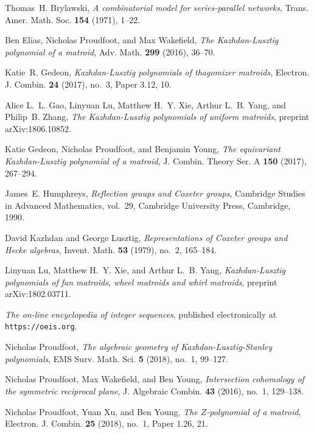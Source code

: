 \documentclass[12pt,reqno]{amsart}
\theoremstyle{definition}
\theoremstyle{remark}
\newcommand{\arxiv}[1]{\href{http://arxiv.org/abs/#1}{\textsf{arXiv:#1}}}
\renewcommand{\(}{\left(}
\renewcommand{\)}{\right)}
\newcommand{\<}{\left<}
\renewcommand{\>}{\right>}
\begin{document}
\newcommand{\etalchar}[1]{$^{#1}$}
\providecommand{\bysame}{\leavevmode\hbox to3em{\hrulefill}\thinspace}
\providecommand{\MR}{\relax\ifhmode\unskip\space\fi MR }
\providecommand{\MRhref}[2]{%
  \href{http://www.ams.org/mathscinet-getitem?mr=#1}{#2}
}
\providecommand{\href}[2]{#2}
\begin{thebibliography}{PWY16}

Thomas~H. Brylawski, \emph{A combinatorial model for series-parallel networks},
  Trans. Amer. Math. Soc. \textbf{154} (1971), 1--22.

Ben Elias, Nicholas Proudfoot, and Max Wakefield, \emph{The {K}azhdan-{L}usztig
  polynomial of a matroid}, Adv. Math. \textbf{299} (2016), 36--70.

Katie~R. Gedeon, \emph{Kazhdan-{L}usztig polynomials of thagomizer matroids},
  Electron. J. Combin. \textbf{24} (2017), no.~3, Paper 3.12, 10.

\bibitem[GLX{\etalchar{+}}]{GLXYZ}
Alice L.~L. Gao, Linyuan Lu, Matthew H.~Y. Xie, Arthur L.~B. Yang, and
  Philip~B. Zhang, \emph{The {K}azhdan-{L}usztig polynomials of uniform
  matroids}, preprint \arxiv{1806.10852}.

Katie Gedeon, Nicholas Proudfoot, and Benjamin Young, \emph{The equivariant
  {K}azhdan-{L}usztig polynomial of a matroid}, J. Combin. Theory Ser. A
  \textbf{150} (2017), 267--294.

James~E. Humphreys, \emph{Reflection groups and {C}oxeter groups}, Cambridge
  Studies in Advanced Mathematics, vol.~29, Cambridge University Press,
  Cambridge, 1990.

David Kazhdan and George Lusztig, \emph{Representations of {C}oxeter groups and
  {H}ecke algebras}, Invent. Math. \textbf{53} (1979), no.~2, 165--184.

Linyuan Lu, Matthew H.~Y. Xie, and Arthur L.~B. Yang, \emph{{K}azhdan-{L}usztig
  polynomials of fan matroids, wheel matroids and whirl matroids}, preprint
  \arxiv{1802.03711}.

\emph{The on-line encyclopedia of integer sequences}, published electronically
  at {\tt https://oeis.org}.

Nicholas Proudfoot, \emph{The algebraic geometry of
  {K}azhdan-{L}usztig-{S}tanley polynomials}, EMS Surv. Math. Sci. \textbf{5}
  (2018), no.~1, 99--127.

Nicholas Proudfoot, Max Wakefield, and Ben Young, \emph{Intersection cohomology
  of the symmetric reciprocal plane}, J. Algebraic Combin. \textbf{43} (2016),
  no.~1, 129--138.

Nicholas Proudfoot, Yuan Xu, and Ben Young, \emph{The {$Z$}-polynomial of a
  matroid}, Electron. J. Combin. \textbf{25} (2018), no.~1, Paper 1.26, 21.

\end{thebibliography}
\end{document}
